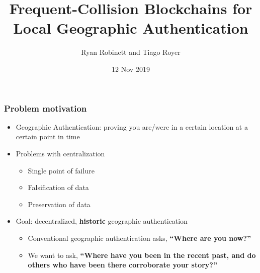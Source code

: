 \documentclass{beamer}
\begin{document}
\title{Frequent-Collision Blockchains for Local Geographic Authentication}
\author{Ryan Robinett and Tiago Royer}
\date{12 Nov 2019}

\begin{frame}
    \titlepage
\end{frame}

\begin{frame}
	\frametitle{Problem motivation}

	\begin{itemize}
		\item Geographic Authentication:
			proving you are/were in a certain location
			at a certain point in time
		\item Problems with centralization
			\begin{itemize}
				\item Single point of failure
				\item Falsification of data
				\item Preservation of data
			\end{itemize}
		\item Goal: decentralized, \textbf{historic} geographic authentication
			\begin{itemize}
				\item Conventional geographic authentication asks, \textbf{``Where are you now?''}
				\item We want to ask, \textbf{``Where have you been in the recent past, and do others who have been there corroborate your story?''}
			\end{itemize}
	\end{itemize}
\end{frame}
\end{document}

